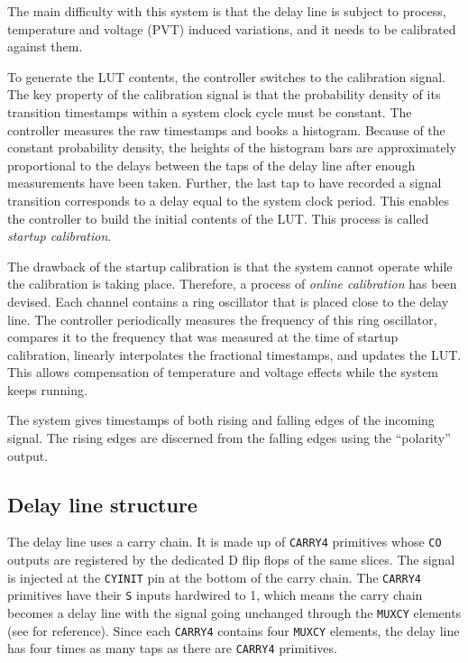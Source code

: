 \documentclass[a4paper,11pt]{article}
\begin{document}
The main difficulty with this system is that the delay line is subject to process, temperature and voltage (PVT) induced variations, and it needs to be calibrated against them.

To generate the LUT contents, the controller switches to the calibration signal. The key property of the calibration signal is that the probability density of its transition timestamps within a system clock cycle must be constant. The controller measures the raw timestamps and books a histogram. Because of the constant probability density, the heights of the histogram bars are approximately proportional to the delays between the taps of the delay line after enough measurements have been taken. Further, the last tap to have recorded a signal transition corresponds to a delay equal to the system clock period. This enables the controller to build the initial contents of the LUT. This process is called \textit{startup calibration}.

The drawback of the startup calibration is that the system cannot operate while the calibration is taking place. Therefore, a process of \textit{online calibration} has been devised. Each channel contains a ring oscillator that is placed close to the delay line. The controller periodically measures the frequency of this ring oscillator, compares it to the frequency that was measured at the time of startup calibration, linearly interpolates the fractional timestamps, and updates the LUT. This allows compensation of temperature and voltage effects while the system keeps running.

The system gives timestamps of both rising and falling edges of the incoming signal. The rising edges are discerned from the falling edges using the ``polarity'' output.

\subsection{Delay line structure}
\label{delaystruct}
The delay line uses a carry chain. It is made up of \verb!CARRY4! primitives whose \verb!CO! outputs are registered by the dedicated D flip flops of the same slices. The signal is injected at the \verb!CYINIT! pin at the bottom of the carry chain. The \verb!CARRY4! primitives have their \verb!S! inputs hardwired to 1, which means the carry chain becomes a delay line with the signal going unchanged through the \verb!MUXCY! elements (see \cite{s6hdl} for reference). Since each \verb!CARRY4! contains four \verb!MUXCY! elements, the delay line has four times as many taps as there are \verb!CARRY4! primitives.
\end{document}
